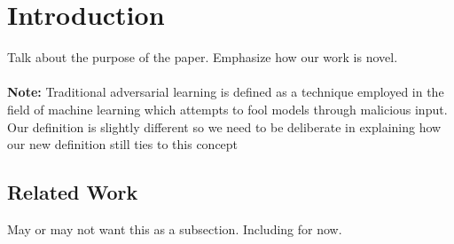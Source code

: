 \begin{abstract}
We present a novel machine learning framework which we apply here to uncover weaknesses in hash functions. Our framework extends the definition of adversarial learning to the domain of cryptographic systems. In this paper, we uncover weaknesses in Merkle{\textendash}Damg\r{a}rd structured hash functions, which include MD5, SHA-1 and SHA-2 and are critical components of cryptographic systems such as key exchange, digital signatures, and password and file verification. Most attacks against these hash functions leverage properties of the particular function. We develop a broader framework of adversarial learning to probabilistically determine how a hash function differs from its ideal state. We show the efficacy of our framework by theoretically and empirically discovering known vulnerabilities in MD5 and discuss how our method can be applied to uncovering potential unknown weaknesses in other hash functions in the Merkle{\textendash}Damg\r{a}rd class.
\end{abstract}

\section{Introduction}

Talk about the purpose of the paper. Emphasize how our work is novel. 
\\
\\
\textbf{Note:} Traditional adversarial learning is defined as a technique employed in the field of machine learning which attempts to fool models through malicious input. Our definition is slightly different so we need to be deliberate in explaining how our new definition still ties to this concept

\subsection{Related Work}
May or may not want this as a subsection. Including for now. 


